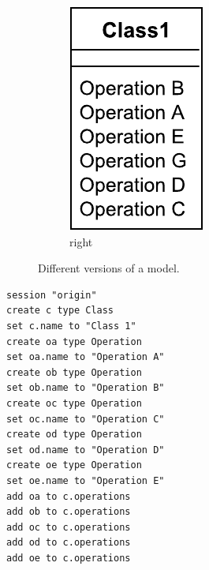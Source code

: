 \documentclass{llncs}
\begin{document}
\begin{minipage}[t]{0.59\linewidth}
\begin{figure}[H]
\begin{subfigure}[t]{0.2\linewidth}
    \includegraphics[width=\linewidth]{images/RightClassDiagram}
    \caption{right}
    \label{fig:right}
\end{subfigure}
\hfill
\label{fig:versions}
\caption{Different versions of a model.}
\end{figure}
\end{minipage}
\hfill
\begin{minipage}[t]{0.39\linewidth}
\begin{lstlisting}[style=eol,caption={The pseudo-formatted CBP of the model in Fig. \ref{fig:origin}.},label=lst:origincbp]
session "origin"
create c type Class
set c.name to "Class 1" 
create oa type Operation
set oa.name to "Operation A" 
create ob type Operation
set ob.name to "Operation B" 
create oc type Operation
set oc.name to "Operation C" 
create od type Operation
set od.name to "Operation D" 
create oe type Operation
set oe.name to "Operation E" 
add oa to c.operations
add ob to c.operations
add oc to c.operations
add od to c.operations
add oe to c.operations
\end{lstlisting}
\end{minipage}
\end{document}
